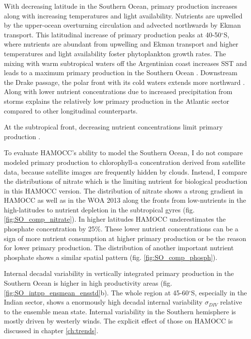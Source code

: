 With decreasing latitude in the Southern Ocean, primary production increases along with increasing temperatures and light availability. Nutrients are upwelled by the upper-ocean overturning circulation and advected northwards by Ekman transport. This latitudinal increase of primary production peaks at 40-50$^\circ$S, where nutrients are abundant from upwelling and Ekman transport and higher temperatures and light availability foster phytoplankton growth rates. The mixing with warm subtropical waters off the Argentinian coast increases \acs{SST} and leads to a maximum primary production in the Southern Ocean \citep{Behrenfeld2014}. Downstream the Drake passage, the polar front with its cold waters extends more northward \citep{Orsi1995}. Along with lower nutrient concentrations due to increased precipitation from storms explains the relatively low primary production in the Atlantic sector compared to other longitudinal counterparts. 

At the subtropical front, decreasing nutrient concentrations limit primary production \citep{Behrenfeld2014}.\newline


To evaluate \acs{HAMOCC}'s ability to model the Southern Ocean, I do not compare modeled primary production to chlorophyll-a  concentration derived from satellite data, because satellite images are frequently  hidden by clouds. Instead, I compare the distributions of nitrate which is the limiting nutrient for biological production in this \acs{HAMOCC} version. %
The distribution of nitrate shows a strong gradient in \acs{HAMOCC} as well as in the  \ac{WOA} 2013  \citep{WOA2013} along the fronts from low-nutrients in the high-latitudes to nutrient depletion in the subtropical gyres (fig. \ref{fig:SO_comp_nitrate}). In higher latitudes \acs{HAMOCC} underestimates the phosphate concentration by 25\%. These lower nutrient concentrations can be a sign of more nutrient consumption at higher primary production or be the reason for lower primary production. The distribution of another important nutrient phosphate shows a similar spatial pattern (fig. \ref{fig:SO_comp_phosph}).\newline

Internal decadal variability in vertically integrated primary production in the Southern Ocean is higher in high productivity areas (fig. \ref{fig:SO_intpp_ensmean_ensstd}b). The whole region at 45-60$^\circ$S, especially in the Indian sector, shows a enormously high decadal internal variability $\sigma_{DIV}$ relative to the ensemble mean state. Internal variability in the Southern hemisphere is mostly driven by westerly winds. The explicit effect of those on \acs{HAMOCC} is discussed in chapter \ref{ch:trends}.\newline

